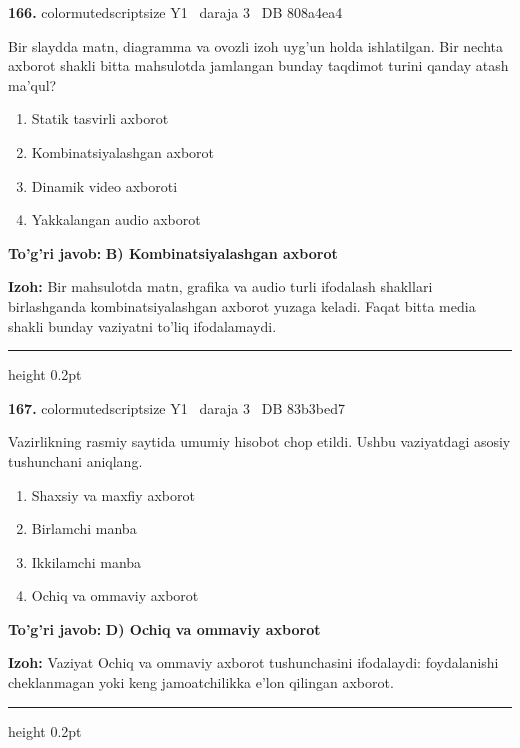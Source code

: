 \documentclass[10pt,a4paper,oneside]{article}
\begin{document}
\noindent\textbf{\color{ink}166.}  {color{muted}scriptsize Y1 \textbullet\ daraja 3 \textbullet\ DB 808a4ea4}
\par
Bir slaydda matn, diagramma va ovozli izoh uyg'un holda ishlatilgan. Bir nechta axborot shakli bitta mahsulotda jamlangan bunday taqdimot turini qanday atash ma'qul?
\begin{enumerate}[label=\Alph*),leftmargin=9mm]
\item Statik tasvirli axborot
\item Kombinatsiyalashgan axborot
\item Dinamik video axboroti
\item Yakkalangan audio axborot
\end{enumerate}
\begin{tcolorbox}[enhanced,breakable,colback=teal!4,colframe=teal!50!black,boxrule=0.5pt,arc=1.1mm,left=3mm,right=3mm,top=1.7mm,bottom=1.7mm,before skip=2mm,after skip=2mm]
\textbf{\color{teal}To'g'ri javob:} \textbf{B) Kombinatsiyalashgan axborot}
\par\smallskip
\textbf{Izoh:} Bir mahsulotda matn, grafika va audio turli ifodalash shakllari birlashganda kombinatsiyalashgan axborot yuzaga keladi. Faqat bitta media shakli bunday vaziyatni to'liq ifodalamaydi.
\end{tcolorbox}
\vspace{2mm}\hrule height 0.2pt \vspace{3mm}

\noindent\textbf{\color{ink}167.}  {color{muted}scriptsize Y1 \textbullet\ daraja 3 \textbullet\ DB 83b3bed7}
\par
Vazirlikning rasmiy saytida umumiy hisobot chop etildi. Ushbu vaziyatdagi asosiy tushunchani aniqlang.
\begin{enumerate}[label=\Alph*),leftmargin=9mm]
\item Shaxsiy va maxfiy axborot
\item Birlamchi manba
\item Ikkilamchi manba
\item Ochiq va ommaviy axborot
\end{enumerate}
\begin{tcolorbox}[enhanced,breakable,colback=teal!4,colframe=teal!50!black,boxrule=0.5pt,arc=1.1mm,left=3mm,right=3mm,top=1.7mm,bottom=1.7mm,before skip=2mm,after skip=2mm]
\textbf{\color{teal}To'g'ri javob:} \textbf{D) Ochiq va ommaviy axborot}
\par\smallskip
\textbf{Izoh:} Vaziyat Ochiq va ommaviy axborot tushunchasini ifodalaydi: foydalanishi cheklanmagan yoki keng jamoatchilikka e'lon qilingan axborot.
\end{tcolorbox}
\vspace{2mm}\hrule height 0.2pt \vspace{3mm}
\end{document}
